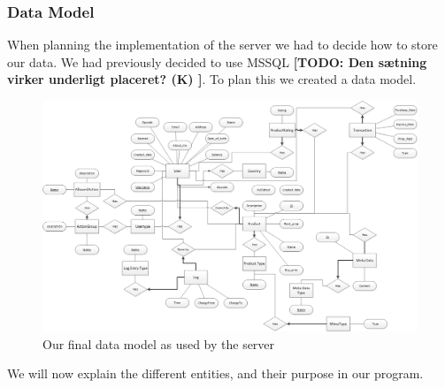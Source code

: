 \subsubsection{Data Model}
When planning the implementation of the server we had to decide how to store our data. We had previously decided to use MSSQL \textbf{[TODO: Den sætning virker underligt placeret? (K) ]}. To plan this we created a data model.
\begin{figure}[H]
  \includegraphics[width=\textwidth]{illustrations/Datamodel.png}
  \caption{Our final data model as used by the server}
  \label{fig:datamodel}
\end{figure}
We will now explain the different entities, and their purpose in our program.

